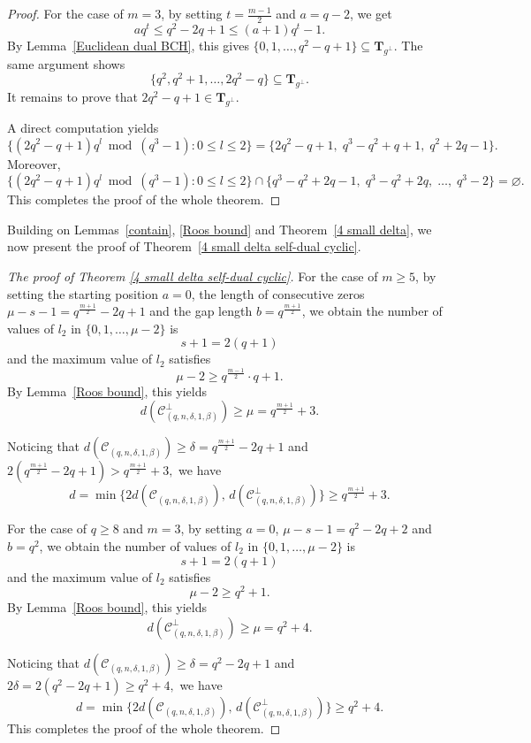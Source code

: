 \documentclass[10pt,a4paper]{amsart}
\begin{document}
\begin{proof}
	For the case of $m=3$, by setting $t = \frac{m-1}{2}$ and $a = q - 2$, we get
	\[
	a q^t \le q^2 - 2q + 1 \le (a+1)q^t - 1.
	\]
	By Lemma~\ref{Euclidean dual BCH}, this gives
	\(
	\{0,1,\dots,q^2 - q + 1\} \subseteq \mathbf{T}_{g^\perp}.
	\)
	The same argument shows
	\[
	\{q^2, q^2+1, \dots, 2q^2 - q\} \subseteq \mathbf{T}_{g^\perp}.
	\]
	It remains to prove that $2q^2 - q + 1 \in \mathbf{T}_{g^\perp}$.
	
	A direct computation yields
	\[
	\{(2q^2 - q + 1) q^l \bmod (q^3 - 1) : 0 \le l \le 2\}
	= \{2q^2 - q + 1,\; q^3 - q^2 + q + 1,\; q^2 + 2q - 1\}.
	\]
	Moreover,
	\[
	\{(2q^2 - q + 1) q^l \bmod (q^3 - 1) : 0 \le l \le 2\}
	\cap
	\{q^3 - q^2 + 2q - 1,\; q^3 - q^2 + 2q,\; \dots,\; q^3 - 2\}
	= \varnothing.
	\]
	This completes the proof of the whole theorem.
\end{proof}

Building on Lemmas~\ref{contain}, \ref{Roos bound} and Theorem~\ref{4 small delta}, we now present the proof of Theorem~\ref{4 small delta self-dual cyclic}.

\begin{proof}[The proof of Theorem \ref{4 small delta self-dual cyclic}]
    For the case of $m \ge 5$, by setting the starting position $a = 0$, the length of consecutive zeros $\mu - s - 1 = q^{\frac{m+1}{2}} - 2q + 1$ and the gap length $b = q^{\frac{m+1}{2}}$, we obtain the number of values of $l_2$ in $\{0,1,\dots,\mu-2\}$ is
    \[
    s + 1 = 2(q+1)
    \]
    and the maximum value of $l_2$ satisfies
    \[
    \mu - 2 \ge q^{\frac{m-1}{2}} \cdot q + 1.
    \]
    By Lemma~\ref{Roos bound}, this yields
    \[
    d(\mathcal{C}^\perp_{(q,n,\delta,1,\beta)}) \ge \mu = q^{\frac{m+1}{2}} + 3.
    \]
    
    Noticing that $d(\mathcal{C}_{(q,n,\delta,1,\beta)}) \ge \delta = q^{\frac{m+1}{2}} - 2q + 1$ and
    \(
    2(q^{\frac{m+1}{2}} - 2q + 1) > q^{\frac{m+1}{2}} + 3,
    \)
    we have
    \[
    d = \min\{2d(\mathcal{C}_{(q,n,\delta,1,\beta)}),\, d(\mathcal{C}^\perp_{(q,n,\delta,1,\beta)})\} \ge q^{\frac{m+1}{2}} + 3.
    \]
    
    For the case of $q\ge 8$ and $m = 3$, by setting $a = 0$, $\mu - s - 1 = q^2 - 2q + 2$ and $b = q^2$, we obtain the number of values of $l_2$ in $\{0,1,\dots,\mu-2\}$ is
    \[
    s + 1 = 2(q+1)
    \]
    and the maximum value of $l_2$ satisfies
    \[
    \mu - 2 \ge q^2 + 1.
    \]
    By Lemma~\ref{Roos bound}, this yields
    \[
    d(\mathcal{C}^\perp_{(q,n,\delta,1,\beta)}) \ge \mu = q^2 + 4.
    \]
    
    Noticing that $d(\mathcal{C}_{(q,n,\delta,1,\beta)}) \ge \delta = q^2 - 2q + 1$ and
    \(
    2\delta = 2(q^2 - 2q + 1) \ge q^2 + 4,
    \)
    we have
    \[
    d = \min\{2d(\mathcal{C}_{(q,n,\delta,1,\beta)}),\, d(\mathcal{C}^\perp_{(q,n,\delta,1,\beta)})\} \ge q^2 + 4.
    \]
    This completes the proof of the whole theorem.
\end{proof}
\end{document}
